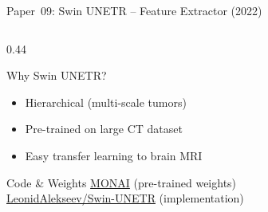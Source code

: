 \documentclass[aspectratio=169,xcolor=dvipsnames]{beamer}
\begin{document}
\begin{frame}{Paper~09: Swin UNETR -- Feature Extractor (2022)}
\begin{columns}
\begin{column}{0.44\textwidth}
            \vspace{0.2em}

            \begin{block}{\small Why Swin UNETR?}
                \scriptsize
                \begin{itemize}
                    \item Hierarchical (multi-scale tumors)
                    \item Pre-trained on large CT dataset
                    \item Easy transfer learning to brain MRI
                \end{itemize}
            \end{block}

            \begin{exampleblock}{\scriptsize {} Code \& Weights}
                \scriptsize 
                \href{https://github.com/Project-MONAI/MONAI}{MONAI} (pre-trained weights)\\
                \href{https://github.com/LeonidAlekseev/Swin-UNETR}{LeonidAlekseev/Swin-UNETR} (implementation)
            \end{exampleblock}
        \end{column}
    \end{columns}
\end{frame}
\end{document}
